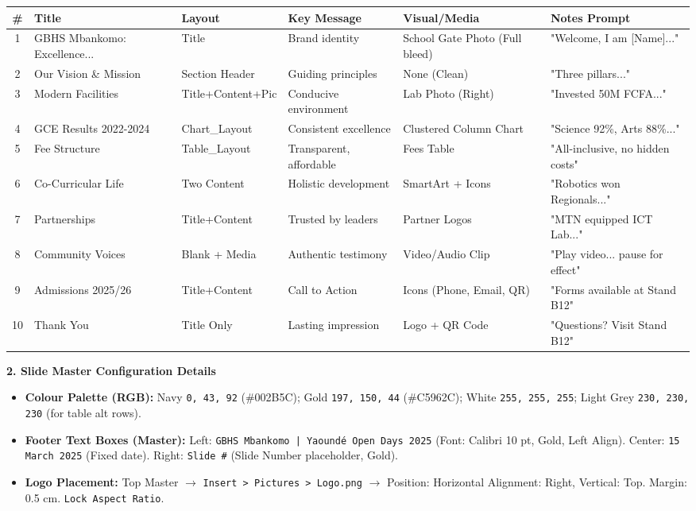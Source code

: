 \documentclass[11pt]{article}
\begin{document}
\begin{center}
\begin{tabularx}{\linewidth}{|c|l|l|X|X|l|}\hline
\rowcolor{popblueL} \textbf{\#} & \textbf{Title} & \textbf{Layout} & \textbf{Key Message} & \textbf{Visual/Media} & \textbf{Notes Prompt} \\ \hline
1 & GBHS Mbankomo: Excellence... & Title & Brand identity & School Gate Photo (Full bleed) & "Welcome, I am [Name]..." \\ \hline
2 & Our Vision \& Mission & Section Header & Guiding principles & None (Clean) & "Three pillars..." \\ \hline
3 & Modern Facilities & Title+Content+Pic & Conducive environment & Lab Photo (Right) & "Invested 50M FCFA..." \\ \hline
4 & GCE Results 2022-2024 & Chart\_Layout & Consistent excellence & Clustered Column Chart & "Science 92\%, Arts 88\%..." \\ \hline
5 & Fee Structure & Table\_Layout & Transparent, affordable & Fees Table & "All-inclusive, no hidden costs" \\ \hline
6 & Co-Curricular Life & Two Content & Holistic development & SmartArt + Icons & "Robotics won Regionals..." \\ \hline
7 & Partnerships & Title+Content & Trusted by leaders & Partner Logos & "MTN equipped ICT Lab..." \\ \hline
8 & Community Voices & Blank + Media & Authentic testimony & Video/Audio Clip & "Play video... pause for effect" \\ \hline
9 & Admissions 2025/26 & Title+Content & Call to Action & Icons (Phone, Email, QR) & "Forms available at Stand B12" \\ \hline
10 & Thank You & Title Only & Lasting impression & Logo + QR Code & "Questions? Visit Stand B12" \\ \hline
\end{tabularx}
\end{center}

\textbf{2. Slide Master Configuration Details}
\begin{itemize}
    \item \textbf{Colour Palette (RGB):} Navy \texttt{0, 43, 92} (\#002B5C); Gold \texttt{197, 150, 44} (\#C5962C); White \texttt{255, 255, 255}; Light Grey \texttt{230, 230, 230} (for table alt rows).
    \item \textbf{Footer Text Boxes (Master):} Left: \texttt{GBHS Mbankomo | Yaoundé Open Days 2025} (Font: Calibri 10 pt, Gold, Left Align). Center: \texttt{15 March 2025} (Fixed date). Right: \texttt{Slide \#} (Slide Number placeholder, Gold).
    \item \textbf{Logo Placement:} Top Master $\rightarrow$ \texttt{Insert > Pictures > Logo.png} $\rightarrow$ Position: Horizontal Alignment: Right, Vertical: Top. Margin: 0.5 cm. \texttt{Lock Aspect Ratio}.
\end{itemize}
\end{document}
